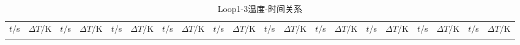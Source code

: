 {\begin{longtable}{cc|cc|cc|cc|cc|cc|cc|cc|cc|cc}
\end{longtable}

\begin{longtable}{cc|cc|cc|cc|cc|cc|cc|cc|cc|cc}
\toprule
\endhead

\caption{Loop1-3温度-时间关系}\\
\toprule
$t$/\si{s} & $\Delta T$/\si{K} & $t$/\si{s} & $\Delta T$/\si{K} & $t$/\si{s} & $\Delta T$/\si{K} & $t$/\si{s} & $\Delta T$/\si{K} & $t$/\si{s} & $\Delta T$/\si{K} & $t$/\si{s} & $\Delta T$/\si{K} & $t$/\si{s} & $\Delta T$/\si{K} & $t$/\si{s} & $\Delta T$/\si{K} & $t$/\si{s} & $\Delta T$/\si{K} & $t$/\si{s} & $\Delta T$/\si{K} \\
\midrule
\endfirsthead

\bottomrule
\endfoot

\bottomrule
\endlastfoot


\end{longtable}}
